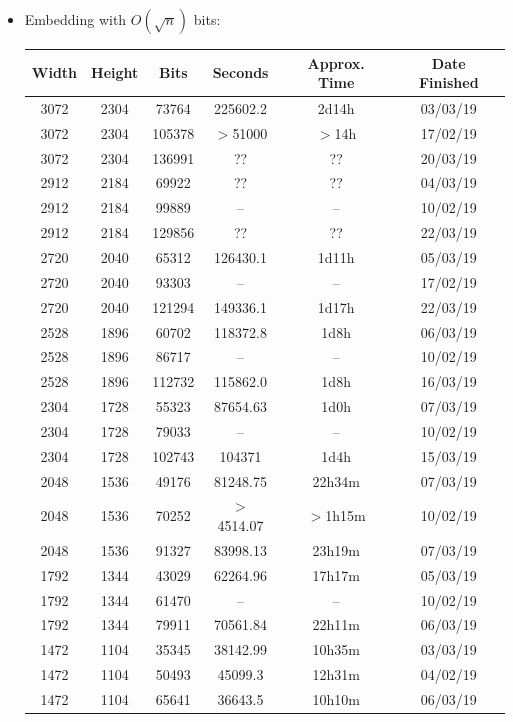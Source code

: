 \documentclass[11pt,a4paper]{report}
\begin{document}
\begin{itemize}
\newpage
\item Embedding with $O(\sqrt{n})$ bits:
  \begin{center}
  \begin{tabular}{ c c c | c c c }
  Width & Height & Bits & Seconds & Approx. Time & Date Finished \\ \hline
  3072 & 2304 & 73764 & 225602.2 & 2d14h & 03/03/19 \\
  3072 & 2304 & 105378 & $>$51000 & $>$14h & 17/02/19 \\
  3072 & 2304 & 136991 & ?? & ?? & 20/03/19 \\ %
  2912 & 2184 & 69922 & ?? & ?? & 04/03/19 \\ %
  2912 & 2184 & 99889 & -- & -- & 10/02/19 \\ %
  2912 & 2184 & 129856 & ?? & ?? & 22/03/19 \\ %
  2720 & 2040 & 65312 & 126430.1 & 1d11h & 05/03/19 \\
  2720 & 2040 & 93303 & -- & -- & 17/02/19 \\ %
  2720 & 2040 & 121294 & 149336.1 & 1d17h & 22/03/19 \\
  2528 & 1896 & 60702 & 118372.8 & 1d8h & 06/03/19 \\
  2528 & 1896 & 86717 & -- & -- & 10/02/19 \\ %
  2528 & 1896 & 112732 & 115862.0 & 1d8h & 16/03/19 \\
  2304 & 1728 & 55323 & 87654.63 & 1d0h & 07/03/19 \\
  2304 & 1728 & 79033 & -- & -- & 10/02/19 \\ %
  2304 & 1728 & 102743 & 104371 & 1d4h & 15/03/19 \\
  2048 & 1536 & 49176 & 81248.75 & 22h34m & 07/03/19 \\
  2048 & 1536 & 70252 & $>$4514.07 & $>$1h15m & 10/02/19 \\
  2048 & 1536 & 91327 & 83998.13 & 23h19m & 07/03/19 \\
  1792 & 1344 & 43029 & 62264.96 & 17h17m & 05/03/19 \\
  1792 & 1344 & 61470 & -- & -- & 10/02/19 \\ %
  1792 & 1344 & 79911 & 70561.84 & 22h11m & 06/03/19 \\
  1472 & 1104 & 35345 & 38142.99 & 10h35m & 03/03/19 \\
  1472 & 1104 & 50493 & 45099.3 & 12h31m & 04/02/19 \\
  1472 & 1104 & 65641 & 36643.5 & 10h10m & 06/03/19 \\

\end{tabular}
\end{center}
\end{itemize}
\end{document}
